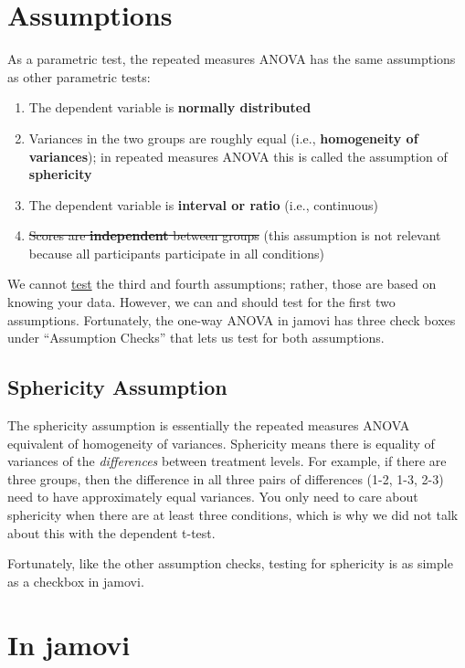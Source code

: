\documentclass[
]{book}
\begin{document}
\hypertarget{assumptions-2}{%
\section{Assumptions}\label{assumptions-2}}

As a parametric test, the repeated measures ANOVA has the same assumptions as other parametric tests:

\begin{enumerate}
\def\labelenumi{\arabic{enumi}.}
\item
  The dependent variable is \textbf{normally distributed}
\item
  Variances in the two groups are roughly equal (i.e., \textbf{homogeneity of variances}); in repeated measures ANOVA this is called the assumption of \textbf{sphericity}
\item
  The dependent variable is \textbf{interval or ratio} (i.e., continuous)
\item
  \sout{Scores are \textbf{independent} between groups} (this assumption is not relevant because all participants participate in all conditions)
\end{enumerate}

We cannot \underline{test} the third and fourth assumptions; rather, those are based on knowing your data. However, we can and should test for the first two assumptions. Fortunately, the one-way ANOVA in jamovi has three check boxes under ``Assumption Checks'' that lets us test for both assumptions.

\hypertarget{sphericity-assumption}{%
\subsection{Sphericity Assumption}\label{sphericity-assumption}}

The sphericity assumption is essentially the repeated measures ANOVA equivalent of homogeneity of variances. Sphericity means there is equality of variances of the \emph{differences} between treatment levels. For example, if there are three groups, then the difference in all three pairs of differences (1-2, 1-3, 2-3) need to have approximately equal variances. You only need to care about sphericity when there are at least three conditions, which is why we did not talk about this with the dependent t-test.

Fortunately, like the other assumption checks, testing for sphericity is as simple as a checkbox in jamovi.

\hypertarget{in-jamovi-2}{%
\section{In jamovi}\label{in-jamovi-2}}
\end{document}
